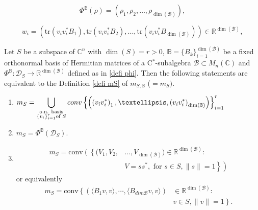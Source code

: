 \documentclass[10pt,a4paper]{amsart}
\def\C{\mathbb C}
\def\R{\mathbb R}
\def\calB{\mathcal B}
\def\calD{\mathcal D}
\def\tr{\text{tr}}
\begin{document}
\begin{equation}\label{defi phi}
	\Phi^{\mathbb{B}}(\rho)= (\rho_1, \rho_2, \dots, \rho_{\dim(\calB)} ),
\end{equation}

	\begin{equation} \label{wi}
		w_i= \left( \tr(v_i v_i^* B_1),\tr(v_i v_i^* B_2),...,\tr(v_i v_i^* B_{\dim(\mathcal{B})})\right)\in \R^{\dim(\mathcal{B})},
	\end{equation}

\begin{proposition} \label{prop 1}
 	Let $S$ be a subspace of $\C^n$ with $\dim(S)=r>0$, $\mathbb{B}=\{B_k\}_{i=1}^{\dim(\calB)}$ be a fixed orthonormal basis of Hermitian matrices of a C$^*$-subalgebra $\calB\subset M_n(\C)$ and  $\Phi^{\mathbb{B}}:\calD_{S}\to\R^{\dim(\calB)}$ defined as in \eqref{defi phi}. Then the following statements are equivalent to the Definition  \ref{defi mS} of $m_{S,\mathbb{B}}$ ($=m_S)$.
% 	
	\begin{enumerate}
			\item \label{item3Prop1}
		$\displaystyle{
			m_S=\mathop{\bigcup}\limits_{\substack{\text{o.n. basis}  \\
					\{v_i\}_{i=1}^{r} \text{of } S}}
			{\rm conv}\left\{ \left(\left(v_i v_i^*\right)_1,\dots, \left(v_i v_i^*\right)_{\dim(\mathbb{B})} \right)  \right\}_{i=1}^{r}
		}$
		\item \label{mS = diag DsubS} $m_S= \Phi^{\mathbb{B}}(\calD_{S})$.
		\item \label{item2Prop1} 		
		\begin{equation*}
			\begin{split}
				m_S=\text{conv}\left(\left\{(V_1,V_2,\right.\right.&\left.\left.\dots,V_{\dim(\calB)})\right.\right.\in\R^{\dim(\calB)}:\\
				&\left.\left.V=s s^*, \text{ for } s\in S, \|s\|=1  \right\} \right)
			\end{split}
		\end{equation*}
		or equivalently
		\begin{equation}\label{eq momento}
			\begin{split}
			m_S=\text{conv}\left\{\left(\langle B_1v,v\rangle, \cdots, \langle B_{dim \calB}v,v\rangle\right)
			\right. 
			& \in\R^{\dim(\calB)}: \\
			 & \left. v\in S, \|v\|=1 \right\}.		
			\end{split}
		\end{equation}
	

\end{enumerate}
\end{proposition}
\end{document}
